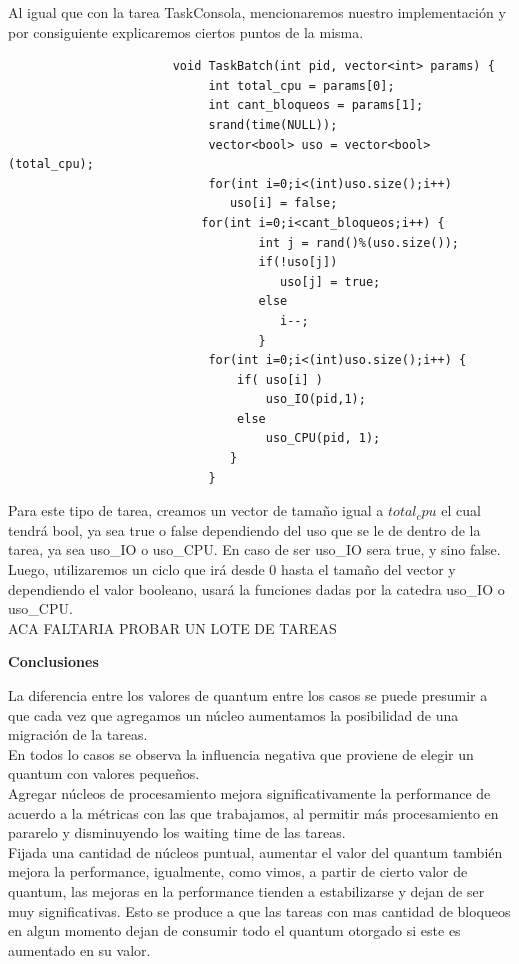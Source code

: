 \indent Al igual que con la tarea TaskConsola, mencionaremos nuestro implementación y por consiguiente  
explicaremos ciertos puntos de la misma.\\
 \begin{verbatim}
                       void TaskBatch(int pid, vector<int> params) {
                            int total_cpu = params[0];
                            int cant_bloqueos = params[1];
                            srand(time(NULL));
                            vector<bool> uso = vector<bool>(total_cpu);
                            for(int i=0;i<(int)uso.size();i++) 
                               uso[i] = false;
	                       for(int i=0;i<cant_bloqueos;i++) {
                                   int j = rand()%(uso.size());
                                   if(!uso[j])
                                      uso[j] = true;
                                   else
                                      i--; 
                                   }
                            for(int i=0;i<(int)uso.size();i++) {
                                if( uso[i] )
                                    uso_IO(pid,1); 
                                else
                                    uso_CPU(pid, 1); 
                               }
                            }
 \end{verbatim}

 \indent Para este tipo de tarea, creamos un vector de tamaño igual a $total_cpu$ el cual tendrá bool, ya sea true o false
 dependiendo del uso que se le de dentro de la tarea, ya sea uso\_IO o uso\_CPU. En caso de ser uso\_IO sera true, y sino false.\\
 Luego, utilizaremos un ciclo que irá desde 0 hasta el tamaño del vector y dependiendo el valor booleano, usará la funciones
 dadas por la catedra uso\_IO o uso\_CPU.\\
 
 
 ACA FALTARIA PROBAR UN LOTE DE TAREAS
 
  \begin{center}
  \textbf{Conclusiones}
 \end{center}


\indent \indent La diferencia entre los valores de quantum entre los casos 
se puede presumir a que cada vez que agregamos un núcleo aumentamos 
la posibilidad de una migración de la tareas.\\
\indent \indent En todos lo casos se observa la influencia negativa que proviene 
de elegir un quantum con valores pequeños.\\
\indent \indent Agregar núcleos de procesamiento mejora significativamente 
la performance de acuerdo a la métricas con las que
trabajamos, al permitir más procesamiento en pararelo y disminuyendo 
los waiting time de las tareas.\\
\indent \indent  Fijada una cantidad de núcleos puntual, aumentar el valor del
quantum también mejora la performance, igualmente, como vimos, a partir de cierto valor 
de quantum, las mejoras en la performance tienden a estabilizarse y dejan de ser 
muy significativas. 
Esto se produce a que las tareas con mas cantidad de bloqueos en 
algun momento dejan de consumir todo el quantum otorgado si este es aumentado en su valor.
